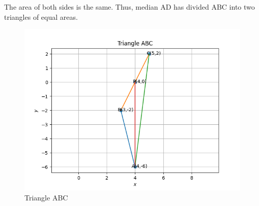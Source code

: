 \documentclass[10pt]{article}
\begin{document}
The area of both sides is the same. Thus, median AD has divided ABC into two triangles of equal areas.
\begin{figure}[H]
			\centering
			\includegraphics[width=\columnwidth]{figs/Figure_1.png}
			\caption{Triangle ABC}
			\label{fig:tri1}
		\end{figure}
\end{document}
